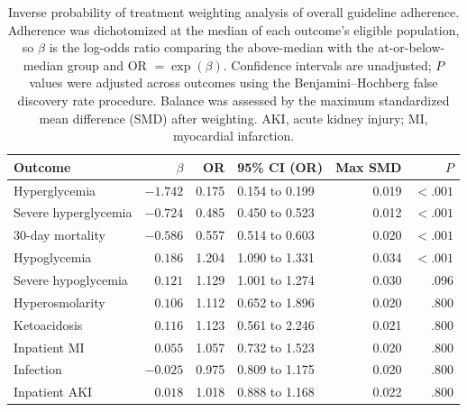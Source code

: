 \begin{table}[t]
\centering
\caption{Inverse probability of treatment weighting analysis of overall
guideline adherence. Adherence was dichotomized at the median of each
outcome's eligible population, so $\beta$ is the log-odds ratio comparing the
above-median with the at-or-below-median group and OR $=\exp(\beta)$.
Confidence intervals are unadjusted; $P$ values were adjusted across outcomes
using the Benjamini--Hochberg false discovery rate procedure. Balance was
assessed by the maximum standardized mean difference (SMD) after weighting.
AKI, acute kidney injury; MI, myocardial infarction.}
\label{tab:iptw-overall}
\small
\setlength{\tabcolsep}{4pt}
\begin{tabular}{lrrlrr}
\toprule
Outcome & $\beta$ & OR & 95\% CI (OR) & Max SMD & $P$ \\
\midrule
Hyperglycemia        & $-1.742$ & 0.175 & 0.154 to 0.199 & 0.019 & $<.001$ \\
Severe hyperglycemia & $-0.724$ & 0.485 & 0.450 to 0.523 & 0.012 & $<.001$ \\
30-day mortality     & $-0.586$ & 0.557 & 0.514 to 0.603 & 0.020 & $<.001$ \\
Hypoglycemia         & $0.186$  & 1.204 & 1.090 to 1.331 & 0.034 & $<.001$ \\
Severe hypoglycemia  & $0.121$  & 1.129 & 1.001 to 1.274 & 0.030 & .096 \\
Hyperosmolarity      & $0.106$  & 1.112 & 0.652 to 1.896 & 0.020 & .800 \\
Ketoacidosis         & $0.116$  & 1.123 & 0.561 to 2.246 & 0.021 & .800 \\
Inpatient MI         & $0.055$  & 1.057 & 0.732 to 1.523 & 0.020 & .800 \\
Infection            & $-0.025$ & 0.975 & 0.809 to 1.175 & 0.020 & .800 \\
Inpatient AKI        & $0.018$  & 1.018 & 0.888 to 1.168 & 0.022 & .800 \\
\bottomrule
\end{tabular}
\end{table}

